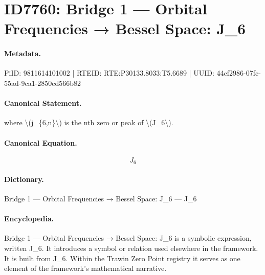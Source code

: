 \section*{ID7760: Bridge 1 — Orbital Frequencies → Bessel Space: J\_6}
\paragraph{Metadata.}
PiID: 9811614101002 | RTEID: RTE:P30133.8033:T5.6689 | UUID: 44cf2986-07fc-55ad-9ca1-2850cd566b82

\paragraph{Canonical Statement.}
where \textbackslash{}(j\_\{6,n\}\textbackslash{}) is the nth zero or peak of \textbackslash{}(J\_6\textbackslash{}).

\paragraph{Canonical Equation.}
\[
J_6
\]

\paragraph{Dictionary.}
Bridge 1 — Orbital Frequencies → Bessel Space: J\_6 — J\_6

\paragraph{Encyclopedia.}
Bridge 1 — Orbital Frequencies → Bessel Space: J\_6 is a symbolic expression, written J\_6. It introduces a symbol or relation used elsewhere in the framework. It is built from J\_6. Within the Trawin Zero Point registry it serves as one element of the framework's mathematical narrative.
